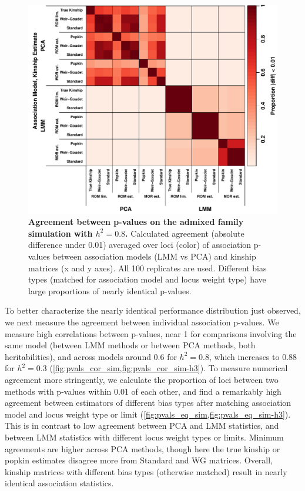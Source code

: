 \documentclass[11pt]{article}
\begin{document}
\begin{linenumbers}
\begin{figure}[bp!]
  \centering
  \includegraphics[width=\textwidth]{sim-admix-n1000-m100000-k3-f0.3-s0.5-mc100-h0.8-g20-fes/pvals_eq.pdf}
  \caption{
    {\bf Agreement between p-values on the admixed family simulation with $h^2=0.8$.}
    Calculated agreement (absolute difference under 0.01) averaged over loci (color) of association p-values between association models (LMM vs PCA) and kinship matrices (x and y axes).
    All 100 replicates are used.
    Different bias types (matched for association model and locus weight type) have large proportions of nearly identical p-values.
    }
  \label{fig:pvals_eq_sim}
\end{figure}

To better characterize the nearly identical performance distribution just observed, we next measure the agreement between individual association p-values.
We measure high correlations between p-values, near 1 for comparisons involving the same model (between LMM methods or between PCA methods, both heritabilities), and across models around 0.6 for $h^2=0.8$, which increases to 0.88 for $h^2=0.3$ (\cref{fig:pvals_cor_sim,fig:pvals_cor_sim-h3}).
To measure numerical agreement more stringently, we calculate the proportion of loci between two methods with p-values within 0.01 of each other, and find a remarkably high agreement between estimators of different bias types after matching association model and locus weight type or limit (\cref{fig:pvals_eq_sim,fig:pvals_eq_sim-h3}).
This is in contrast to low agreement between PCA and LMM statistics, and between LMM statistics with different locus weight types or limits.
Minimum agreements are higher across PCA methods, though here the true kinship or popkin estimates disagree more from Standard and WG matrices.
Overall, kinship matrices with different bias types (otherwise matched) result in nearly identical association statistics.


\end{linenumbers}
\end{document}
